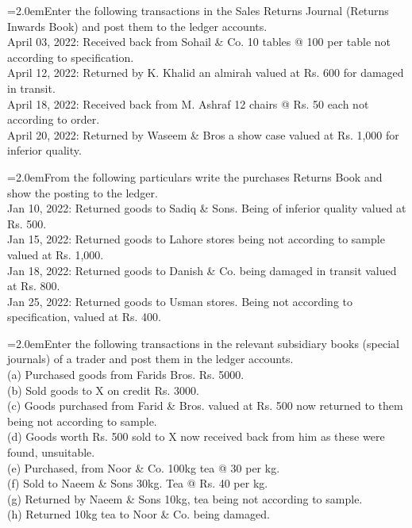 \documentclass[11pt,a4paper]{article}
\newcommand{\lqn}[2]{\Needspace{6\baselineskip}\par\medskip\noindent\hangindent=2.0em\hangafter=1\makebox[2.0em][l]{\textbf{#1.}}#2\par}
\begin{document}
\lqn{55}{Enter the following transactions in the Sales Returns Journal (Returns Inwards Book) and post them to the ledger accounts.\\
April 03, 2022:   Received back from Sohail \& Co. 10 tables @ 100 per table not according to specification.\\
April 12, 2022:   Returned by K. Khalid an almirah valued at Rs. 600 for damaged in transit.\\
April 18, 2022:   Received back from M. Ashraf 12 chairs @ Rs. 50 each not according to order.\\
April 20, 2022:   Returned by Waseem \& Bros a show case valued at Rs. 1,000 for inferior quality.\par
}
\lqn{56}{From the following particulars write the purchases Returns Book and show the posting to the ledger.\\
Jan 10, 2022:    Returned goods to Sadiq \& Sons. Being of inferior quality valued at Rs. 500.\\
Jan 15, 2022:    Returned goods to Lahore stores being not according to sample valued at Rs. 1,000.\\
Jan 18, 2022:    Returned goods to Danish \& Co. being damaged in transit valued at Rs. 800.\\
Jan 25, 2022:    Returned goods to Usman stores. Being not according to specification, valued at Rs. 400.\par
}
\lqn{57}{Enter the following transactions in the relevant subsidiary books (special journals) of a trader and post them in the ledger accounts.\\
(a) Purchased goods from Farids Bros. Rs. 5000.\\
(b) Sold goods to X on credit Rs. 3000.\\
(c) Goods purchased from Farid \& Bros. valued at Rs. 500 now returned to them being not according to sample.\\
(d) Goods worth Rs. 500 sold to X now received back from him as these were found, unsuitable.\\
(e) Purchased, from Noor \& Co. 100kg tea @ 30 per kg.\\
(f) Sold to Naeem \& Sons 30kg. Tea @ Rs. 40 per kg.\\
(g) Returned by Naeem \& Sons 10kg, tea being not according to sample.\\
(h) Returned 10kg tea to Noor \& Co. being damaged.\par
}
\end{document}
